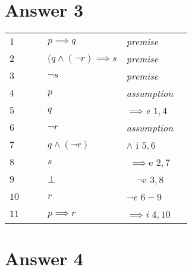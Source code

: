 \documentclass[12pt]{article}
\begin{document}
\section*{Answer 3}
\begin{table}[H]
	\centering
    
	\begin{tabular}{*6{l}}
		$1$ & & & $p \implies q$ & \textit{premise} \\
		
		$2$ & & & $(q \land (\neg r) \implies s$ & \textit{premise} \\
		
		$3$ & & & $\neg s$ & \textit{premise} \\ \cline{2-6}
		
		$4$ &\multicolumn{1}{|c}{} & & $p$ &\textit{assumption} &\multicolumn{1}{c|}{} \\ 
		
		$5$ &\multicolumn{1}{|c}{} & & $q$ &\textit{$\implies $e $1,4$} &\multicolumn{1}{c|}{} \\ \cline{3-5}
		
		$6$ &\multicolumn{1}{|c}{}&\multicolumn{1}{|c}{$$}& $\neg r$ &\multicolumn{1}{l|}{\textit{assumption}}&\multicolumn{1}{c|}{} \\ 
		
		$7$ &\multicolumn{1}{|c}{}&\multicolumn{1}{|c}{}& $q \land (\neg r)$ &\multicolumn{1}{l|}{$\land$ i $5,6$}&\multicolumn{1}{c|}{} \\
		
		$8$ &\multicolumn{1}{|c}{}&\multicolumn{1}{|c}{}& $s$ & \multicolumn{1}{c|}{$\implies$e $2,7$} &\multicolumn{1}{c|}{} \\  
		
		$9$ &\multicolumn{1}{|c}{}&\multicolumn{1}{|c}{}& $\bot$ & \multicolumn{1}{c|}{$\neg$e $3,8$} &\multicolumn{1}{c|}{} \\ \cline{3-5}
		
		$10$ &\multicolumn{1}{|c}{} & & $r$ &\textit{$\neg$e $6-9$} &\multicolumn{1}{c|}{} \\  \cline{2-6}
		

		$11$ & & & $p \implies r$ & \textit{$\implies$i $4,10$} \\
	
	\end{tabular}
\end{table}

\section*{Answer 4}
\end{document}
